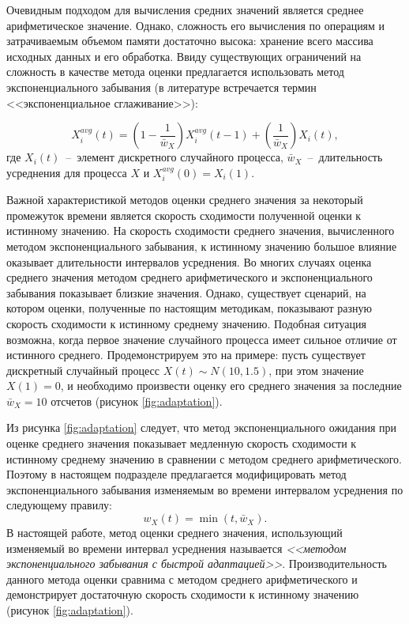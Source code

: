 Очевидным подходом для вычисления средних значений является среднее арифметическое значение. Однако, сложность его вычисления по операциям и затрачиваемым объемом памяти достаточно высока: хранение всего массива исходных данных и его обработка. Ввиду существующих ограничений на сложность в качестве метода оценки предлагается использовать метод экспоненциального забывания (в литературе встречается термин <<экспоненциальное сглаживание>>):

$$X_i^{avg}(t) = \left(1 - \frac{1}{\bar{w}_{X}}\right)X_i^{avg}(t - 1) + \left(\frac{1}{\bar{w}_{X}}\right)X_i(t),$$
где $X_i(t)$~--~элемент дискретного случайного процесса, $\bar{w}_{X}$~--~длительность усреднения для процесса $X$ и $X_i^{avg}(0) = X_i(1)$.

Важной характеристикой методов оценки среднего значения за некоторый промежуток времени является скорость сходимости полученной оценки к истинному значению. На скорость сходимости среднего значения, вычисленного методом экспоненциального забывания, к истинному значению большое влияние оказывает длительности интервалов усреднения. Во многих случаях оценка среднего значения методом среднего арифметического и экспоненциального забывания показывает близкие значения. Однако, существует сценарий, на котором оценки, полученные по настоящим методикам, показывают разную скорость сходимости к истинному среднему значению. Подобная ситуация возможна, когда первое значение случайного процесса имеет сильное отличие от истинного среднего. Продемонстрируем это на примере: пусть существует дискретный случайный процесс $X(t) \sim N(10,1.5)$, при этом значение $X(1) = 0$, и необходимо произвести оценку его среднего значения за последние $\bar{w}_{X} = 10$ отсчетов (рисунок \ref{fig:adaptation}).

Из рисунка \ref{fig:adaptation} следует, что метод экспоненциального ожидания при оценке среднего значения показывает медленную скорость сходимости к истинному среднему значению в сравнении с методом среднего арифметического. Поэтому в настоящем подразделе предлагается модифицировать метод экспоненциального забывания изменяемым во времени интервалом усреднения по следующему правилу:
$$w_{X}(t) = \min(t, \bar{w}_{X}).$$
В настоящей работе, метод оценки среднего значения, использующий изменяемый во времени интервал усреднения называется \textit{<<методом экспоненциального забывания с быстрой адаптацией>>}. Производительность данного метода оценки сравнима с методом среднего арифметического и демонстрирует достаточную скорость сходимости к истинному значению (рисунок \ref{fig:adaptation}).

